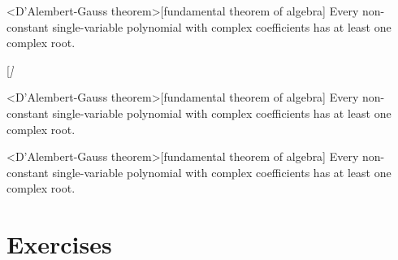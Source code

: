 \documentclass[english,ColorTheme=Red,FontSize=10pt]{tango}
\begin{document}
\begin{thm}<D'Alembert-Gauss theorem>[fundamental theorem of algebra]
Every non-constant single-variable polynomial with complex coefficients has 
at least one complex root.
\end{thm}
[\itshape]
\begin{thm}<D'Alembert-Gauss theorem>[fundamental theorem of algebra]
Every non-constant single-variable polynomial with complex coefficients has 
at least one complex root.
\end{thm}
\begin{thm}<D'Alembert-Gauss theorem>[fundamental theorem of algebra]
Every non-constant single-variable polynomial with complex coefficients has 
at least one complex root.
\end{thm}



\section{Exercises}
\end{document}
